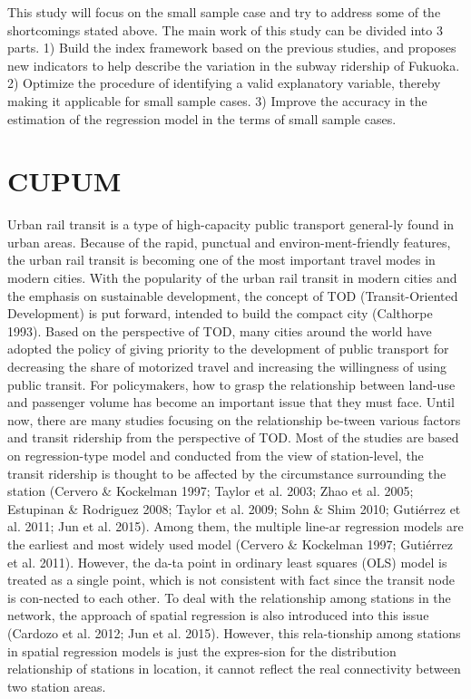 This study will focus on the small sample case and try to address some of the shortcomings stated above. The main work of this study can be divided into 3 parts. 1) Build the index framework based on the previous studies, and proposes new indicators to help describe the variation in the subway ridership of Fukuoka. 2) Optimize the procedure of identifying a valid explanatory variable, thereby making it applicable for small sample cases. 3) Improve the accuracy in the estimation of the regression model in the terms of small sample cases.

\section{CUPUM}
Urban rail transit is a type of high-capacity public transport general-ly found in urban areas. Because of the rapid, punctual and environ-ment-friendly features, the urban rail transit is becoming one of the most important travel modes in modern cities. With the popularity of the urban rail transit in modern cities and the emphasis on sustainable development, the concept of TOD (Transit-Oriented Development) is put forward, intended to build the compact city (Calthorpe 1993). Based on the perspective of TOD, many cities around the world have adopted the policy of giving priority to the development of public transport for decreasing the share of motorized travel and increasing the willingness of using public transit. For policymakers, how to grasp the relationship between land-use and passenger volume has become an important issue that they must face.
Until now, there are many studies focusing on the relationship be-tween various factors and transit ridership from the perspective of TOD. Most of the studies are based on regression-type model and conducted from the view of station-level, the transit ridership is thought to be affected by the circumstance surrounding the station (Cervero \& Kockelman 1997; Taylor et al. 2003; Zhao et al. 2005; Estupinan \& Rodriguez 2008; Taylor et al. 2009; Sohn \& Shim 2010; Gutiérrez et al. 2011; Jun et al. 2015). Among them, the multiple line-ar regression models are the earliest and most widely used model (Cervero \& Kockelman 1997; Gutiérrez et al. 2011). However, the da-ta point in ordinary least squares (OLS) model is treated as a single point, which is not consistent with fact since the transit node is con-nected to each other. To deal with the relationship among stations in the network, the approach of spatial regression is also introduced into this issue (Cardozo et al. 2012; Jun et al. 2015). However, this rela-tionship among stations in spatial regression models is just the expres-sion for the distribution relationship of stations in location, it cannot reflect the real connectivity between two station areas.

